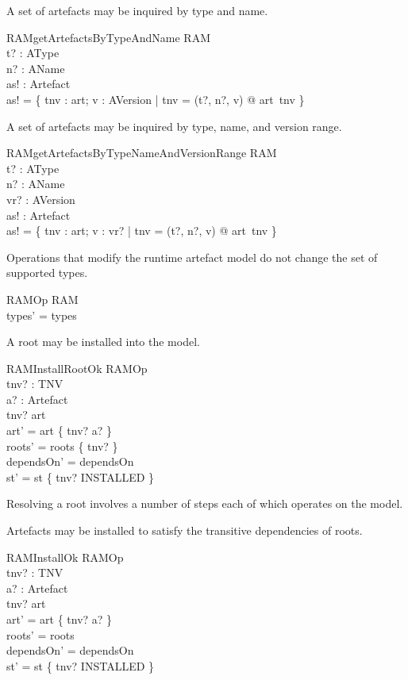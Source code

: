 \documentclass[a4paper,12pt]{article}
\begin{document}
A set of artefacts may be inquired by type and name.
\begin{schema}{RAMgetArtefactsByTypeAndName}
\Xi RAM \\
t? : AType \\
n? : AName \\
as! : \power Artefact \\
\where
as! = \{ tnv : \dom art; v : AVersion | tnv = (t?, n?, v) @ art~tnv \} \\
\end{schema}

A set of artefacts may be inquired by type, name, and version range.
\begin{schema}{RAMgetArtefactsByTypeNameAndVersionRange}
\Xi RAM \\
t? : AType \\
n? : AName \\
vr? : \power AVersion \\
as! : \power Artefact \\
\where
as! = \{ tnv : \dom art; v : vr? | tnv = (t?, n?, v) @ art~tnv \} \\
\end{schema}

Operations that modify the runtime artefact model do not change the set of supported types.
\begin{schema}{RAMOp}
\Delta RAM \\
\where
types' = types \\
\end{schema}

A root may be installed into the model.
\begin{schema}{RAMInstallRootOk}
RAMOp \\
tnv? : TNV \\
a? : Artefact \\
\where
tnv? \notin \dom art \\
art' = art \cup \{ tnv? \mapsto a? \} \\
roots' = roots \cup \{ tnv? \} \\
dependsOn' = dependsOn \\
st' = st \cup \{ tnv? \mapsto INSTALLED \} \\
\end{schema}

Resolving a root involves a number of steps each of which operates on the model.

Artefacts may be installed to satisfy the transitive dependencies of roots.
\begin{schema}{RAMInstallOk}
RAMOp \\
tnv? : TNV \\
a? : Artefact \\
\where
tnv? \notin \dom art \\
art' = art \cup \{ tnv? \mapsto a? \} \\
roots' = roots \\
dependsOn' = dependsOn \\
st' = st \cup \{ tnv? \mapsto INSTALLED \} \\
\end{schema}
\end{document}
